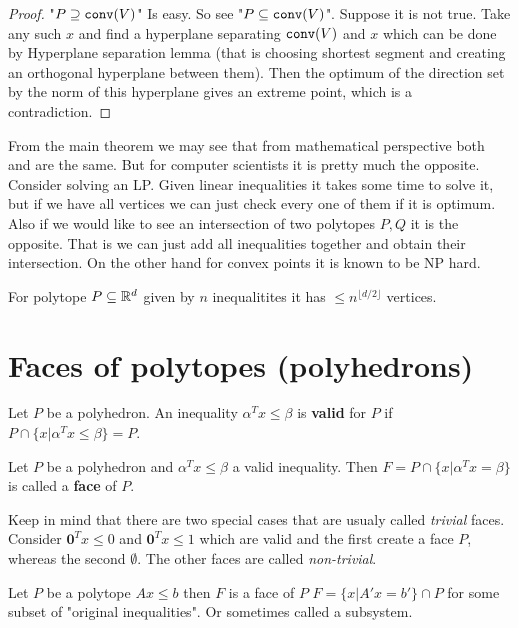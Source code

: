 \begin{proof}
	"$P \supseteq \mathtt{conv}(V)$" Is easy. So see "$P \subseteq \mathtt{conv}(V)$". Suppose it is not true. Take any such $x$ and find a hyperplane separating $\mathtt{conv}(V)$ and $x$ which can be done by Hyperplane separation lemma (that is choosing shortest segment and creating an orthogonal hyperplane between them). Then the optimum of the direction set by the norm of this hyperplane gives an extreme point, which is a contradiction.
\end{proof}

From the main theorem we may see that from mathematical perspective both  and  are the same. But for computer scientists it is pretty much the opposite. Consider solving an LP. Given linear inequalities it takes some time to solve it, but if we have all vertices we can just check every one of them if it is optimum. Also if we would like to see an intersection of two polytopes $P,Q$ it is the opposite. That is we can just add all inequalities together and obtain their intersection. On the other hand for convex points it is known to be NP hard.

\begin{fact}
	For polytope $P \subseteq \mathbb{R}^{d}$ given by $n$ inequalitites it has $\leq n^{\lfloor d/2 \rfloor}$ vertices.
\end{fact}

\section{Faces of polytopes (polyhedrons)}

\begin{defn}
	Let $P$ be a polyhedron. An inequality $\alpha^{T} x \leq \beta$ is \textbf{valid} for $P$ if $P \cap \{x | \alpha^{T} x \leq \beta\} = P$.
\end{defn}

\begin{defn}
	Let $P$ be a polyhedron and $\alpha^{T} x \leq \beta$ a valid inequality. Then $F = P \cap \{x | \alpha^{T} x = \beta\}$ is called a \textbf{face} of $P$.
\end{defn}

Keep in mind that there are two special cases that are usualy called \textit{trivial} faces. Consider $\bm{0}^{T} x \leq 0$ and $\bm{0}^{T} x \leq 1$ which are valid and the first create a face $P$, whereas the second $\emptyset$. The other faces are called \textit{non-trivial}.

\begin{thm}
	Let $P$ be a polytope $A x \leq b$ then $F$ is a face of $P$ \ifft $F = \{x | A' x = b'\} \cap P$ for some subset of "original inequalities". Or sometimes called a subsystem.
\end{thm}

